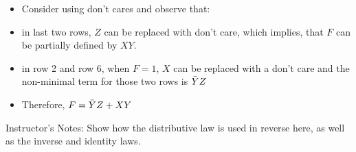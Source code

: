 \begin{frame}[fragile]
\begin{itemize}
\begin{multicols}{2}
\small
\begin{itemize}
    \item Recall, {\footnotesize $F=\Bar{X}\Bar{Y}Z + X\Bar{Y}Z + XY\Bar{Z} + XYZ$}
    \item This is equivalent to $F = \Bar{Y}Z + XY$
\end{itemize}
\end{multicols}
 \item Consider using don't cares and observe that:
    \item in last two rows, $Z$ can be replaced with don't care, which implies, that $F$ can be partially defined by $XY$.
    \item in row 2 and row 6, when $F=1$, $X$ can be replaced with a don't care and the non-minimal term for those two rows is $\Bar{Y}Z$
    \item Therefore, $F = \Bar{Y}Z + XY$
\end{itemize}
\BNotes\ifnum{}
Instructor's Notes:
Show how the distributive law is used in reverse here, as well as the
inverse and identity laws.
\fi\ENotes
\end{frame}

